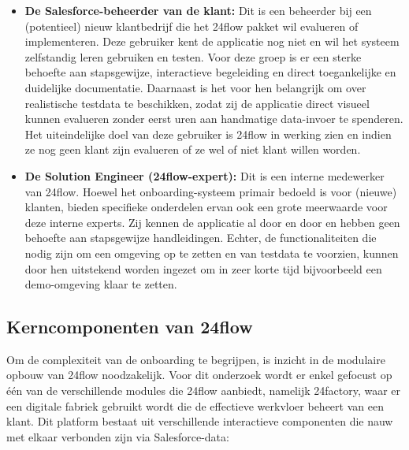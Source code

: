 \begin{itemize}
	\item \textbf{De Salesforce-beheerder van de klant:} Dit is een beheerder bij een (potentieel) nieuw klantbedrijf die het 24flow pakket wil evalueren of implementeren. Deze gebruiker kent de applicatie nog niet en wil het systeem zelfstandig leren gebruiken en testen. Voor deze groep is er een sterke behoefte aan stapsgewijze, interactieve begeleiding en direct toegankelijke en duidelijke documentatie. Daarnaast is het voor hen belangrijk om over realistische testdata te beschikken, zodat zij de applicatie direct visueel kunnen evalueren zonder eerst uren aan handmatige data-invoer te spenderen. Het uiteindelijke doel van deze gebruiker is 24flow in werking zien en indien ze nog geen klant zijn evalueren of ze wel of niet klant willen worden.
	
	\item \textbf{De Solution Engineer (24flow-expert):} Dit is een interne medewerker van 24flow. Hoewel het onboarding-systeem primair bedoeld is voor (nieuwe) klanten, bieden specifieke onderdelen ervan ook een grote meerwaarde voor deze interne experts. Zij kennen de applicatie al door en door en hebben geen behoefte aan stapsgewijze handleidingen. Echter, de functionaliteiten die nodig zijn om een omgeving op te zetten en van testdata te voorzien, kunnen door hen uitstekend worden ingezet om in zeer korte tijd bijvoorbeeld een demo-omgeving klaar te zetten.
\end{itemize}

\subsection{Kerncomponenten van 24flow}
\label{subsec:kerncomponenten_24flow}
Om de complexiteit van de onboarding te begrijpen, is inzicht in de modulaire opbouw van 24flow noodzakelijk. Voor dit onderzoek wordt er enkel gefocust op één van de verschillende modules die 24flow aanbiedt, namelijk 24factory, waar er een digitale fabriek gebruikt wordt die de effectieve werkvloer beheert van een klant. Dit platform bestaat uit verschillende interactieve componenten die nauw met elkaar verbonden zijn via Salesforce-data:

